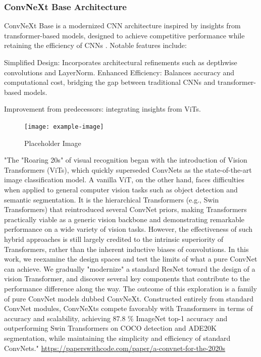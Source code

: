 
\subsubsection{ConvNeXt Base Architecture}
\label{sec:convnext}
ConvNeXt Base is a modernized CNN architecture inspired by insights from transformer-based models, designed to achieve competitive performance while retaining the efficiency of CNNs \cite{todi2023convnext}. Notable features include:

Simplified Design: Incorporates architectural refinements such as depthwise convolutions and LayerNorm.
Enhanced Efficiency: Balances accuracy and computational cost, bridging the gap between traditional CNNs and transformer-based models. 

Improvement from predecessors: integrating insights from ViTs.

\begin{figure}[ht]
    \centering
    \texttt{[image: example-image]} 
    \caption{Placeholder Image }
    \label{fig:placeholder2}
\end{figure}

"The "Roaring 20s" of visual recognition began with the introduction of Vision Transformers (ViTs), which quickly superseded ConvNets as the state-of-the-art image classification model. A vanilla ViT, on the other hand, faces difficulties when applied to general computer vision tasks such as object detection and semantic segmentation. It is the hierarchical Transformers (e.g., Swin Transformers) that reintroduced several ConvNet priors, making Transformers practically viable as a generic vision backbone and demonstrating remarkable performance on a wide variety of vision tasks. However, the effectiveness of such hybrid approaches is still largely credited to the intrinsic superiority of Transformers, rather than the inherent inductive biases of convolutions. In this work, we reexamine the design spaces and test the limits of what a pure ConvNet can achieve. We gradually "modernize" a standard ResNet toward the design of a vision Transformer, and discover several key components that contribute to the performance difference along the way. The outcome of this exploration is a family of pure ConvNet models dubbed ConvNeXt. Constructed entirely from standard ConvNet modules, ConvNeXts compete favorably with Transformers in terms of accuracy and scalability, achieving 87.8 \% ImageNet top-1 accuracy and outperforming Swin Transformers on COCO detection and ADE20K segmentation, while maintaining the simplicity and efficiency of standard ConvNets." \url{https://paperswithcode.com/paper/a-convnet-for-the-2020s}


